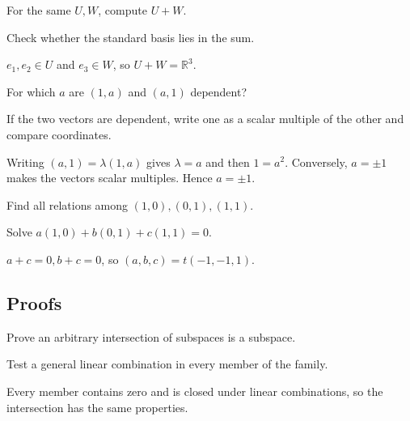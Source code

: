 \begin{exercise}[Sum]\label{exr:i02-expand-03}
For the same \(U,W\), compute \(U+W\).
\end{exercise}
\begin{hint}
Check whether the standard basis lies in the sum.
\end{hint}
\begin{solution}
\(e_1,e_2\in U\) and \(e_3\in W\), so \(U+W=\mathbb R^3\).
\end{solution}

\begin{exercise}\label{exr:i02-expand-04}
For which \(a\) are \((1,a)\) and \((a,1)\) dependent?
\end{exercise}
\begin{hint}
If the two vectors are dependent, write one as a scalar multiple of the other and compare coordinates.
\end{hint}
\begin{solution}
Writing $(a,1)=\lambda(1,a)$ gives $\lambda=a$ and then $1=a^2$. Conversely, $a=\pm1$ makes the vectors scalar multiples. Hence $a=\pm1$.
\end{solution}

\begin{exercise}\label{exr:i02-expand-05}
Find all relations among \((1,0),(0,1),(1,1)\).
\end{exercise}
\begin{hint}
Solve \(a(1,0)+b(0,1)+c(1,1)=0\).
\end{hint}
\begin{solution}
\(a+c=0,b+c=0\), so \((a,b,c)=t(-1,-1,1)\).
\end{solution}

\subsection*{Proofs}

\begin{exercise}\label{exr:i02-expand-06}
Prove an arbitrary intersection of subspaces is a subspace.
\end{exercise}
\begin{hint}
Test a general linear combination in every member of the family.
\end{hint}
\begin{solution}
Every member contains zero and is closed under linear combinations, so the intersection has the same properties.
\end{solution}

